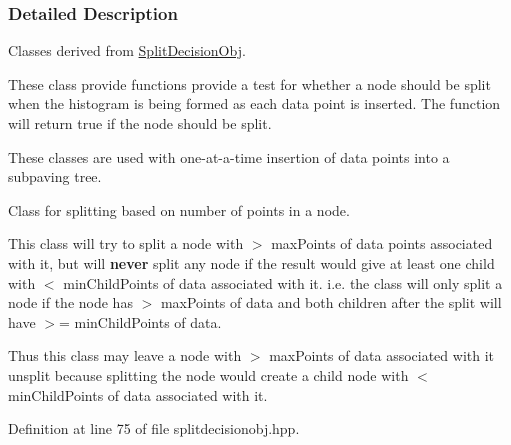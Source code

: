 \subsubsection{\-Detailed \-Description}
\-Classes derived from \hyperlink{classsubpavings_1_1SplitDecisionObj}{\-Split\-Decision\-Obj}. 

\-These class provide functions provide a test for whether a node should be split when the histogram is being formed as each data point is inserted. \-The function will return true if the node should be split.

\-These classes are used with one-\/at-\/a-\/time insertion of data points into a subpaving tree.

\-Class for splitting based on number of points in a node.

\-This class will try to split a node with $>$ max\-Points of data points associated with it, but will {\bfseries never} split any node if the result would give at least one child with $<$ min\-Child\-Points of data associated with it. i.\-e. the class will only split a node if the node has $>$ max\-Points of data and both children after the split will have $>$= min\-Child\-Points of data.

\-Thus this class may leave a node with $>$ max\-Points of data associated with it unsplit because splitting the node would create a child node with $<$ min\-Child\-Points of data associated with it. 

\-Definition at line 75 of file splitdecisionobj.\-hpp.



